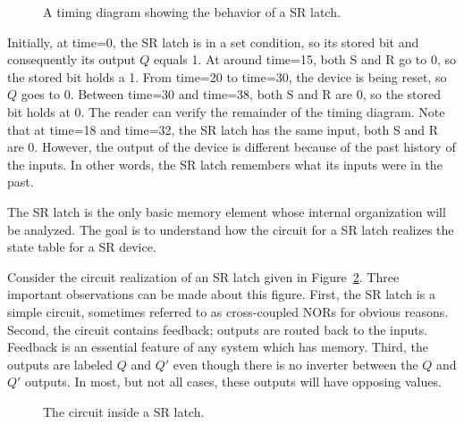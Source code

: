 \begin{figure}[ht]
\caption{A timing diagram showing the behavior of a 
SR latch.}
\label{fig:SRLtime}
\end{figure}

Initially, at time=0, the SR latch is in a set condition, so its
stored bit and consequently its output $Q$ equals 1.  At around
time=15, both S and R go to 0, so the stored bit holds a 1.  From
time=20 to time=30, the device is being reset, so $Q$ goes to 0.  Between
time=30 and time=38, both S and R are 0, so the stored bit holds at 0.
The reader can verify the remainder of the timing diagram.  
Note that at time=18 and time=32, the SR latch has the same input, both
S and R are 0.  However, the output of the device is different because
of the past history of the inputs.  In other words, the SR latch
remembers what its inputs were in the past.

The SR latch is the only basic memory element whose internal
organization will be analyzed.  The goal is to understand how
the circuit for a SR latch realizes the state table for a SR
device.  

Consider the circuit realization of an SR latch 
given in Figure~\ref{fig:SRL}.  Three important
observations can be made about this figure. First, the SR 
latch is a simple circuit, sometimes referred to as cross-coupled 
NORs for obvious reasons.  Second, the circuit contains feedback;
outputs are routed back to the inputs.  Feedback is an essential 
feature of any system which has memory.  Third, the outputs are 
labeled $Q$ and $Q'$ even though there is no inverter between the 
$Q$ and $Q'$ outputs.  In most, but not all cases, these 
outputs will have opposing values.

\begin{figure}[ht]
\caption{The circuit inside a SR latch.}
\label{fig:SRL}
\end{figure}


